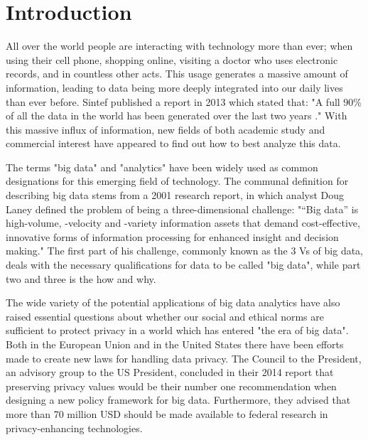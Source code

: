 
\chapter{Introduction}
All over the world people are interacting with technology more than ever; when using their cell phone, shopping online, visiting a doctor who uses electronic records, and in countless other acts. This usage generates a massive amount of information, leading to data being more deeply integrated into our daily lives than ever before. Sintef published a report in 2013 which stated that: "A full 90\% of all the data in the world has been generated over the last two years \cite{dragland2013big}." With this massive influx of information, new fields of both academic study and commercial interest have appeared to find out how to best analyze this data. 

The terms "big data" and "analytics" have been widely used as common designations for this emerging field of technology. The communal definition for describing big data stems from a 2001 research report, in which analyst Doug Laney defined the problem of being a three-dimensional challenge: "“Big data” is high-volume, -velocity and -variety information assets that demand cost-effective, innovative forms of information processing for enhanced insight and decision making." The first part of his challenge, commonly known as the 3 Vs of big data, deals with the necessary qualifications for data to be called "big data", while part two and three is the how and why.  
   
The wide variety of the potential applications of big data analytics have also raised essential questions about whether our social and ethical norms are sufficient to protect privacy in a world which has entered "the era of big data". Both in the European Union and in the United States there have been efforts made to create new laws for handling data privacy. The Council to the President, an advisory group to the US President, concluded in their 2014 report \cite{house2014bigdata} that preserving privacy values would be their number one recommendation when designing a new policy framework for big data. Furthermore, they advised that more than 70 million USD should be made available to federal research in privacy-enhancing technologies. 

